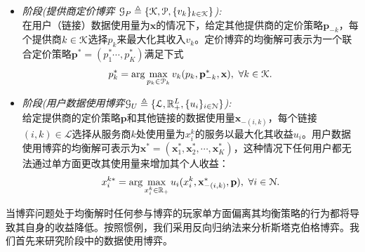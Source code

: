 \begin{df}\label{def:mlmf}
\mbox{}
\begin{itemize}
    \item \emph{阶段\uppercase\expandafter{}(提供商定价博弈 $\mathcal{G}_P\triangleq\{\mathcal{K},\mathcal{P},\{v_k\}_{k\in\mathcal{K}}\}$):} \\
    在用户（链接）数据使用量为$\mathbf{x}$的情况下，给定其他提供商的定价策略$\mathbf{p}_{-k}$，每个提供商$k\in\mathcal{K}$选择$p_k$来最大化其收入$v_k$。定价博弈的均衡解可表示为一个联合定价策略$\mathbf{p}^*=(p^{*}_{1}\cdots,p^{*}_{K})$满足下式
        \begin{equation}
          p^*_k=\arg\max_{p_k\in\mathcal{P}_k}v_k(p_k,\mathbf{p}^{*}_{-k},\mathbf{x}), ~\forall k\in\mathcal{K}.
        \end{equation}
        
    \item \emph{阶段\uppercase\expandafter{}(用户数据使用博弈$\mathcal{G}_U\triangleq\{\mathcal{L},\mathbb{R}_+^L,\{u_i\}_{i\in\mathcal{N}}\}$):}\\
    给定提供商的定价策略$\mathbf{p}$和其他链接的数据使用量$\mathbf{x}_{-(i,k)}$，每个链接$(i,k)\in\mathcal{L}$选择从服务商$k$处使用量为$x^{k}_i$的服务以最大化其收益$u_ {i}$。用户数据使用博弈的均衡解可表示为$\mathbf{x^*}=(\mathbf{x}^*_{1},\mathbf{x}^*_{2},\cdots,\mathbf{x}^*_{K})$，这种情况下任何用户都无法通过单方面更改其使用量来增加其个人收益：
        \begin{equation}
          x^{k*}_i=\arg\max_{x^{k}_i\in \mathbb{R}_+}u_i(x^{k}_i,\mathbf{x}^*_{-(i,k)},\mathbf{p}), ~\forall i\in\mathcal{N}.
        \end{equation}
\end{itemize}
\end{df}

当博弈问题处于均衡解时任何参与博弈的玩家单方面偏离其均衡策略的行为都将导致其自身的收益降低。按照惯例，我们采用反向归纳法\cite{osborne}来分析斯塔克伯格博弈。我们首先来研究阶段\uppercase\expandafter{}中的数据使用博弈。

